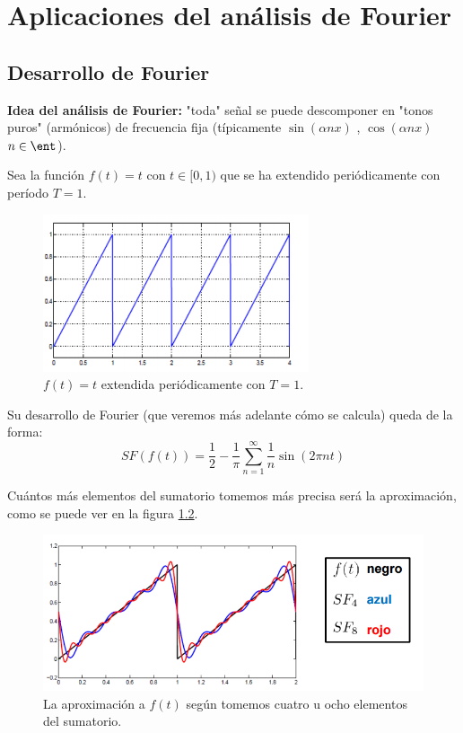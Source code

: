 
\chapter{Aplicaciones del análisis de Fourier}
\section{Desarrollo de Fourier}
\textbf{Idea del análisis de Fourier:} "toda" señal se puede descomponer en "tonos puros" (armónicos) de frecuencia fija (típicamente $\sin(\alpha n x)$ , $\cos(\alpha n x)$  $ n \in \ent$).


\begin{example}
Sea la función $f(t)=t$ con $t\in[0,1)$ que se ha extendido periódicamente con período $T=1$.

\begin{figure}[hbtp]
\centering
\includegraphics[width=\linewidth]{img/id_period.png}
\caption{$f(t) = t$ extendida periódicamente con $T = 1$.}
\label{figExtensionFt}
\end{figure}

Su desarrollo de Fourier (que veremos más adelante cómo se calcula) queda de la forma:
\[SF(f(t))=\frac{1}{2}-\frac{1}{π}\sum_{n=1}^{\infty}\frac{1}{n}\sin(2πnt)\]

Cuántos más elementos del sumatorio tomemos más precisa será la aproximación, como se puede ver en la figura \ref{figAproximacionFt}.

\begin{figure}[hbtp]
\centering
\includegraphics[width=\linewidth]{img/id_period_fourier.png}
\caption{La aproximación a $f(t)$ según tomemos cuatro u ocho elementos del sumatorio.}
\label{figAproximacionFt}
\end{figure}


\end{example}
